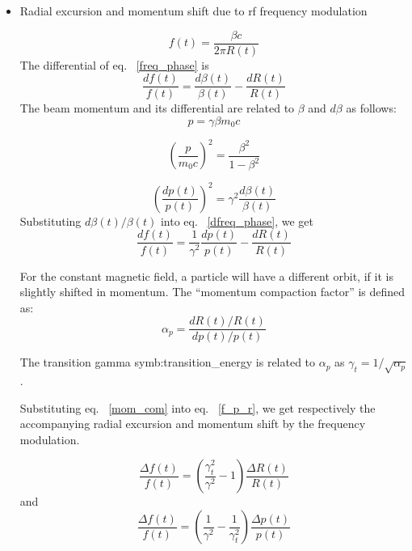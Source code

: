 \begin{itemize}
	\item Radial excursion and momentum shift due to rf frequency modulation

\begin{equation}
f(t)=\frac{\beta c}{2\pi R(t)} \label{freq_phase}
\end{equation}
The differential of eq. ~\ref{freq_phase} is
\begin{equation}
\frac{df(t)}{f(t)}=\frac{d\beta(t)}{\beta(t)}-\frac{dR(t)}{R(t)} \label{dfreq_phase}
\end{equation}
The beam momentum and its differential are related to $\beta$ and $d\beta$ as follows: 
\begin{equation}
p=\gamma \beta m_0c
\end{equation}

\begin{equation}
(\frac{p}{m_0c})^2=\frac{\beta^2}{1-\beta^2}
\end{equation}

\begin{equation}
(\frac{dp(t)}{p(t)})^2=\gamma^2\frac{d\beta(t)}{\beta(t)}
\end{equation}
Substituting $d\beta(t)/\beta(t)$ into eq. ~\ref{dfreq_phase}, we get 
\begin{equation}
\frac{df(t)}{f(t)}=\frac{1}{\gamma^2}\frac{dp(t)}{p(t)}-\frac{dR(t)}{R(t)}\label{f_p_r}
\end{equation} 

For the constant magnetic field, a particle will have a different orbit, if it is slightly shifted in momentum. The “momentum compaction factor” is defined as:
\begin{equation}
\alpha_p=\frac{dR(t)/R(t)}{dp(t)/p(t)}\label{mom_com}
\end{equation} 

The transition gamma \gls{symb:transition_energy} is related to $\alpha_p$ as $\gamma_t=1/\sqrt{\alpha_p}$.

Substituting eq. ~\ref{mom_com} into eq. ~\ref{f_p_r}, we get respectively the accompanying radial excursion and momentum shift by the frequency modulation.

\begin{equation}
\label{eq:phaseR}
\frac{\Delta{f(t)}}{f(t)} =({\frac{\gamma_t^2}{\gamma^2}-1}) \frac{\Delta{R(t)}}{R(t)}
\end{equation}
and
\begin{equation}
\frac{\Delta{f(t)}}{f(t)} = (\frac{1}{\gamma^2}-\frac{1}{\gamma_t^2})\frac{\Delta{p(t)}}{p(t)}
\label{eq:phaseP}
\end{equation}


\end{itemize}
